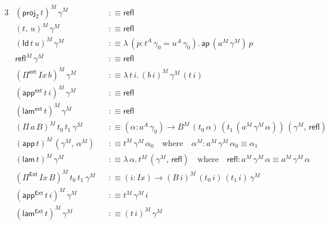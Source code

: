 \documentclass[12pt,a4paper,twoside,openany]{book}
\theoremstyle{remark}
\theoremstyle{definition}
\theoremstyle{theorem}
\newcommand{\mi}[1]{\mathit{#1}}
\newcommand{\ms}[1]{\mathsf{#1}}
\newcommand{\ap}{\ms{ap}}
\newcommand{\refl}{\mathsf{refl}}
\newcommand{\Id}{\mathsf{Id}}
\newcommand{\proj}{\mathsf{proj}}
\newcommand{\Pie}{\Pi^{\mathsf{Ext}}}
\newcommand{\appe}{\mathsf{app^{Ext}}}
\newcommand{\lame}{\mathsf{lam^{Ext}}}
\newcommand{\Piinf}{\Pi^{\mathsf{ext}}}
\newcommand{\appinf}{\mathsf{app^{ext}}}
\newcommand{\laminf}{\mathsf{lam^{ext}}}
\newcommand{\app}{\ms{app}}
\newcommand{\lam}{\ms{lam}}
\newcommand{\defn}{:\equiv}
\begin{document}
\begin{alignat*}{3}
  &(\proj_2\,t)^M\,\gamma^M &&\defn \refl\\
  &(t,\,u)^M\,\gamma^M &&\defn \refl \\
  &(\Id\,t\,u)^M\,\gamma^M &&\defn \lambda\,(p : t^A\,\gamma_0 = u^A\,\gamma_0).\,\ap\,(a^M\,\gamma^M)\,p\\
  &\refl^M\,\gamma^M &&\defn \refl\\
  &(\Piinf\,\mi{Ix}\,b)^M\,\gamma^M &&\defn \lambda\,t\,i.\,(b\,i)^M\,\gamma^M\,(t\,i)\\
  &(\appinf\,t\,i)^M\,\gamma^M &&\defn \refl \\
  &(\laminf\,t)^M\,\gamma^M &&\defn \refl \\
  &(\Pi\,a\,B)^M\,t_0\,t_1\,\gamma^M &&\defn (\alpha : a^A\,\gamma_0) \to B^M\,(t_0\,\alpha)\,(t_1\,(a^M\,\gamma^M\,\alpha))\,(\gamma^M,\,\refl)\\
  &(\app\,t)^M\,(\gamma^M,\,\alpha^M) &&\defn t^M\,\gamma^M\,\alpha_0\hspace{1em}\text{where}\hspace{1em} \alpha^M : a^M\,\gamma^M\,\alpha_0 \equiv \alpha_1\\
  &(\lam\,t)^M\,\gamma^M &&\defn \lambda\,\alpha.\,t^M\,(\gamma^M,\,\refl)\hspace{1em}\text{where}\hspace{1em} \refl : a^M\,\gamma^M\,\alpha \equiv a^M\,\gamma^M\,\alpha\\
  &(\Pie\,\mi{Ix}\,B)^M\,t_0\,t_1\,\gamma^M &&\defn (i : \mi{Ix}) \to (B\,i)^M\,(t_0\,i)\,(t_1\,i)\,\gamma^M\\
  &(\appe\,t\,i)^M\,\gamma^M &&\defn t^M\,\gamma^M\,i\\
  &(\lame\,t)^M\,\gamma^M &&\defn (t\,i)^M\,\gamma^M
\end{alignat*}
\end{document}
